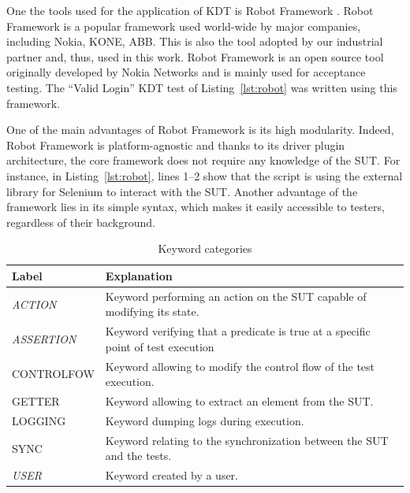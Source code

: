 One the tools used for the application of KDT is Robot Framework \cite{RobotFramework2020}. Robot Framework is a popular framework used world-wide by major companies, including Nokia, KONE, ABB. This is also the tool adopted by our industrial partner and, thus, used in this work. Robot Framework is an open source tool originally developed by Nokia Networks and is mainly used for acceptance testing. The ``Valid Login'' KDT test of Listing~\ref{lst:robot} was written using this framework.

One of the main advantages of Robot Framework is its high modularity.  Indeed, Robot Framework is platform-agnostic and thanks to its driver plugin architecture, the core framework does not require any knowledge of the SUT. For instance, in Listing~\ref{lst:robot}, lines 1--2 show that the script is using the external library for Selenium to interact with the SUT. Another advantage of the framework lies in its simple syntax, which makes it easily accessible to testers, regardless of their background.

\begin{table}
\caption{Keyword categories}
\label{keywords_categories}
\centering
\begin{tabular}{>{\raggedright}m{0.9in}>{\raggedright}m{4in}}
\toprule
\textbf{\scriptsize{Label}} & \textbf{\scriptsize{Explanation}}\tabularnewline
\toprule

\scriptsize{\textit{ACTION}} & \scriptsize{Keyword performing an action on the
SUT capable of modifying its state.} \tabularnewline

\scriptsize{\textit{ASSERTION}} & \scriptsize{Keyword verifying that a predicate
is true at a specific point of test execution} \tabularnewline

\scriptsize{CONTROLFOW} & \scriptsize{Keyword allowing to modify the
                                   control flow of the test execution.} \tabularnewline

\scriptsize{GETTER} & \scriptsize{Keyword allowing to extract an element from
the SUT.} \tabularnewline

\scriptsize{LOGGING} & \scriptsize{Keyword dumping logs during execution.}
\tabularnewline

\scriptsize{SYNC} & \scriptsize{Keyword relating to the
                                  synchronization between the SUT and the tests.} \tabularnewline

\scriptsize{\textit{USER}} & \scriptsize{Keyword created by a user.}
\tabularnewline

\bottomrule
\end{tabular}
\end{table}


